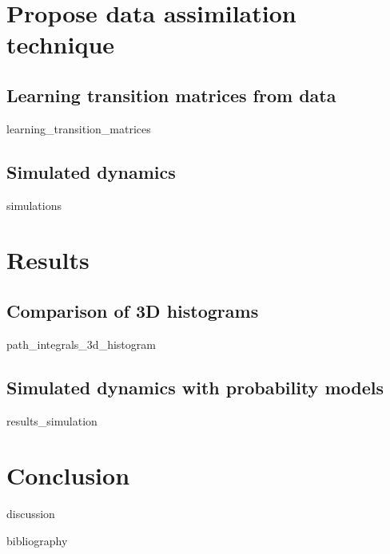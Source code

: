 \documentclass[10pt,a4paper]{report}
\begin{document}

\chapter{Propose data assimilation technique}

\FloatBarrier
\section{Learning transition matrices from data}
	{learning_transition_matrices}

\FloatBarrier
\section{Simulated dynamics}
	{simulations}

\FloatBarrier



\chapter{Results}

\FloatBarrier
\section{Comparison of 3D histograms}
	{path_integrals_3d_histogram}

\FloatBarrier
\section{Simulated dynamics with probability models}
	{results_simulation}



\chapter{Conclusion}

\FloatBarrier
	{discussion}




\FloatBarrier


{bibliography}
\printbibliography
\end{document}
